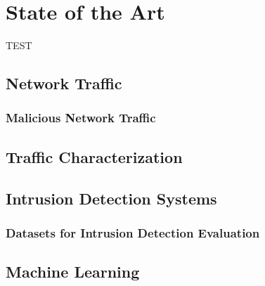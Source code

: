 \chapter{State of the Art}

TEST

\section{Network Traffic}
\label{sec:network-traffic}

\subsection{Malicious Network Traffic}
\label{subsec:malicious-traffic}

\section{Traffic Characterization}
\label{sec:traffic-characterization}

\section{Intrusion Detection Systems}
\label{sec:intrusion-detection-system}

\subsection{Datasets for Intrusion Detection Evaluation}
\label{subsec:datasets-for-evaluation}

\section{Machine Learning}
\label{sec:machine-learning}